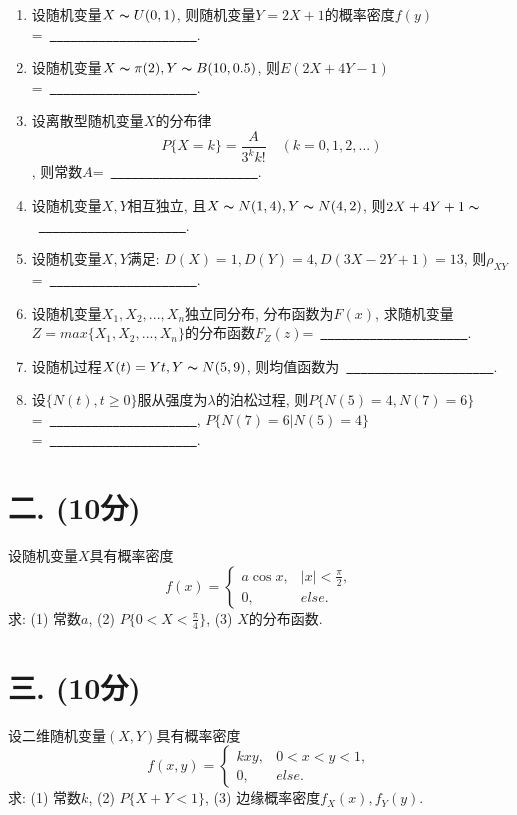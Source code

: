 \documentclass[a4paper,11pt]{article}
\newcommand{\blank}{\uline{\textcolor{white}{a}\ \textcolor{white}{a}\ \textcolor{white}{a}\ \textcolor{white}{a}\ \textcolor{white}{a}\ \textcolor{white}{a}\ \textcolor{white}{a}\ \textcolor{white}{a}\ \textcolor{white}{a}\ \textcolor{white}{a}\ \textcolor{white}{a}}}
\begin{document}
\begin{CJK}{UTF8}{song}
\begin{enumerate}
\item 设随机变量$X \thicksim U(0,1)$, 则随机变量$Y=2X+1$的概率密度$f(y)$=~\blank.

\item 设随机变量$X \thicksim \pi(2), Y \thicksim B(10,0.5)$, 则$E(2X+4Y-1)$=~\blank.

\item 设离散型随机变量$X$的分布律
\begin{displaymath}
P\{X=k\}=\frac{A}{3^k k!}\quad (k=0,1,2,...)
\end{displaymath}
, 则常数$A$=~\blank.

\item 设随机变量$X,Y$相互独立, 且$X \thicksim N(1,4), Y\thicksim N(4,2)$, 则$2X+4Y+1 \thicksim$~\blank.

\item 设随机变量$X,Y$满足: $D(X)=1, D(Y)=4, D(3X-2Y+1)=13$, 则$\rho_{XY}$=~\blank.

\item 设随机变量$X_1,X_2,...,X_n$独立同分布, 分布函数为$F(x)$, 求随机变量$Z=max\{X_1,X_2,...,X_n\}$的分布函数$F_Z(z)$=~\blank.

\item 设随机过程$X(t)=Yt, Y \thicksim N(5,9)$, 则均值函数为~\blank.

\item 设$\{N(t),t\ge 0\}$服从强度为$\lambda$的泊松过程, 则$P\{N(5)=4,N(7)=6\}$=~\blank, $P\{N(7)=6 | N(5)=4\}$=~\blank.

\end{enumerate}

\newpage

\section*{二. (10分)}

设随机变量$X$具有概率密度
\[
f(x)=
    \left\{
        \begin{array}{ll}
            a\cos x,   &\textrm{$\displaystyle{ |x|<\frac{\pi}{2}, }$} \\
            0,      &\textrm{$else$.}
        \end{array}
    \right.
\]
求: (1) 常数$a$, (2) $\displaystyle{ P\{0<X<\frac{\pi}{4}\} }$, (3) $X$的分布函数.

\section*{三. (10分)}

设二维随机变量$(X,Y)$具有概率密度
\[
f(x,y)=
    \left\{
        \begin{array}{ll}
            kxy,    &\textrm{$0<x<y<1,$} \\
            0,      &\textrm{$else$.}
        \end{array}
    \right.
\]
求: (1) 常数$k$, (2) $P\{X+Y<1\}$, (3) 边缘概率密度$f_X(x), f_Y(y)$.


\end{CJK}
\end{document}
